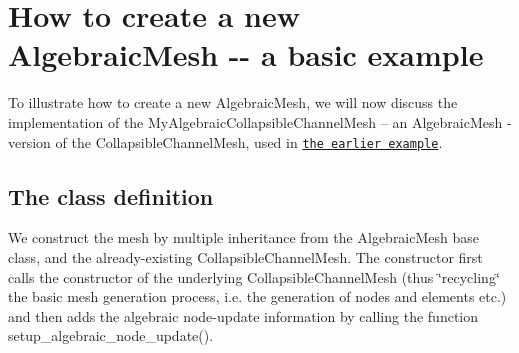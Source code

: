  

\hypertarget{index_how_to_write}{}\section{How to create a new Algebraic\+Mesh -\/-\/ a basic example}\label{index_how_to_write}
To illustrate how to create a new {\ttfamily Algebraic\+Mesh}, we will now discuss the implementation of the {\ttfamily My\+Algebraic\+Collapsible\+Channel\+Mesh} -- an {\ttfamily Algebraic\+Mesh} -\/ version of the {\ttfamily Collapsible\+Channel\+Mesh}, used in \href{../../collapsible_channel/html/index.html}{\tt the earlier example}.



\hypertarget{index_class}{}\subsection{The class definition}\label{index_class}
We construct the mesh by multiple inheritance from the {\ttfamily Algebraic\+Mesh} base class, and the already-\/existing {\ttfamily Collapsible\+Channel\+Mesh}. The constructor first calls the constructor of the underlying {\ttfamily Collapsible\+Channel\+Mesh} (thus \char`\"{}recycling\char`\"{} the basic mesh generation process, i.\+e. the generation of nodes and elements etc.) and then adds the algebraic node-\/update information by calling the function {\ttfamily setup\+\_\+algebraic\+\_\+node\+\_\+update()}.

